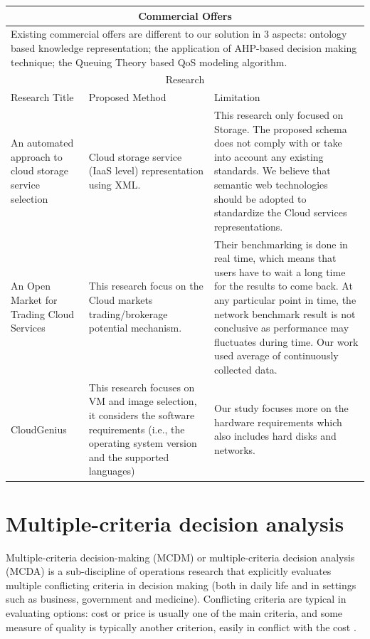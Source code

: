 \begin{longtable}{ p{30mm} | p{50mm} | p{50mm} }
\hline
\multicolumn{3}{c}{Commercial Offers}\\
\hline
\multicolumn{3}{p{140mm}}{
Existing commercial offers
\cite{BurstormRecommendation, CloudHarmonyProviderDirectory, RightscaleCloudPricingService, Cloudorado, CloudReviews}
are different to our solution in 3 aspects:
ontology based knowledge representation;
the application of AHP-based decision making technique;
the Queuing Theory based QoS modeling algorithm.}\\
\hline
\multicolumn{3}{c}{Research}\\
\hline
Research Title & Proposed Method & Limitation \\ 
\hline
    An automated approach to cloud storage service selection \cite{Ruiz-AlvarezCloudStorageSelection}&
    Cloud storage service (IaaS level) representation using XML.&
    This research only focused on Storage.
    The proposed schema does not comply with or take into account any existing standards. We believe that semantic web technologies should be adopted to standardize the Cloud services representations.\\
\hline
    An Open Market for Trading Cloud Services \cite{OpenMarketforTradingCloudServices}&
    This research focus on the Cloud markets trading/brokerage potential mechanism. &
    Their benchmarking is done in real time, which means that users
    have to wait a long time for the results to come back.
    At any particular point in time, the network benchmark result is not conclusive as performance may fluctuates during time.
    Our work used average of continuously collected data.\\
\hline
    CloudGenius \cite{CloudGenius} &
    This research focuses on VM and image selection,
    it considers the software requirements
    (i.e., the operating system version and the supported
    languages) &
    Our study focuses more on the hardware requirements
    which also includes hard disks and networks.\\
\hline
\end{longtable}

\section{Multiple-criteria decision analysis}
\label{sec:MCDA}
Multiple-criteria decision-making (MCDM) or multiple-criteria decision analysis (MCDA) is a sub-discipline of operations research that explicitly evaluates multiple conflicting criteria in decision making (both in daily life and in settings such as business, government and medicine). Conflicting criteria are typical in evaluating options: cost or price is usually one of the main criteria, and some measure of quality is typically another criterion, easily in conflict with the cost \cite{MCDA}.

